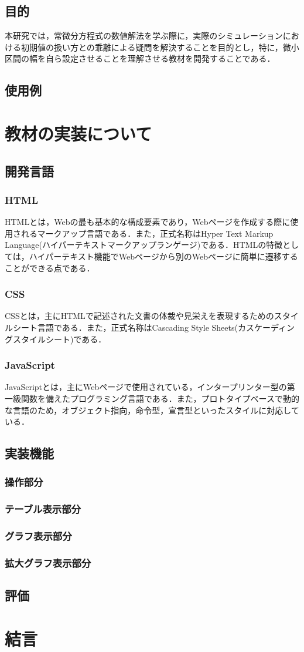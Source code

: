 \documentclass[a4paper, 12pt]{ltjsarticle}
\begin{document}
\subsection{目的}
本研究では，常微分方程式の数値解法を学ぶ際に，実際のシミュレーションにおける初期値の扱い方との乖離による疑問を解決することを目的とし，特に，微小区間の幅を自ら設定させることを理解させる教材を開発することである．
\subsection{使用例}
\clearpage
\section{教材の実装について}
\subsection{開発言語}
\subsubsection{HTML}
HTMLとは，Webの最も基本的な構成要素であり，Webページを作成する際に使用されるマークアップ言語である．また，正式名称はHyper Text Markup Language(ハイパーテキストマークアップランゲージ)である．HTMLの特徴としては，ハイパーテキスト機能でWebページから別のWebページに簡単に遷移することができる点である．
\subsubsection{CSS}
CSSとは，主にHTMLで記述された文書の体裁や見栄えを表現するためのスタイルシート言語である．また，正式名称はCascading Style Sheets(カスケーディングスタイルシート)である．
\subsubsection{JavaScript}
JavaScriptとは，主にWebページで使用されている，インタープリンター型の第一級関数を備えたプログラミング言語である．また，プロトタイプベースで動的な言語のため，オブジェクト指向，命令型，宣言型といったスタイルに対応している．
\clearpage
\subsection{実装機能}
\subsubsection{操作部分}
\subsubsection{テーブル表示部分}
\subsubsection{グラフ表示部分}
\subsubsection{拡大グラフ表示部分}
\subsection{評価}
\clearpage
\section{結言}
\clearpage

\end{document}
